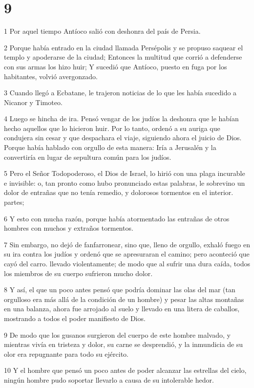 \chapter{9}

\par 1 Por aquel tiempo Antíoco salió con deshonra del país de Persia.
\par 2 Porque había entrado en la ciudad llamada Persépolis y se propuso saquear el templo y apoderarse de la ciudad; Entonces la multitud que corrió a defenderse con sus armas los hizo huir; Y sucedió que Antíoco, puesto en fuga por los habitantes, volvió avergonzado.
\par 3 Cuando llegó a Ecbatane, le trajeron noticias de lo que les había sucedido a Nicanor y Timoteo.
\par 4 Luego se hincha de ira. Pensó vengar de los judíos la deshonra que le habían hecho aquellos que lo hicieron huir. Por lo tanto, ordenó a su auriga que condujera sin cesar y que despachara el viaje, siguiendo ahora el juicio de Dios. Porque había hablado con orgullo de esta manera: Iría a Jerusalén y la convertiría en lugar de sepultura común para los judíos.
\par 5 Pero el Señor Todopoderoso, el Dios de Israel, lo hirió con una plaga incurable e invisible: o, tan pronto como hubo pronunciado estas palabras, le sobrevino un dolor de entrañas que no tenía remedio, y dolorosos tormentos en el interior. partes;
\par 6 Y esto con mucha razón, porque había atormentado las entrañas de otros hombres con muchos y extraños tormentos.
\par 7 Sin embargo, no dejó de fanfarronear, sino que, lleno de orgullo, exhaló fuego en su ira contra los judíos y ordenó que se apresuraran el camino; pero aconteció que cayó del carro. llevado violentamente; de modo que al sufrir una dura caída, todos los miembros de su cuerpo sufrieron mucho dolor.
\par 8 Y así, el que un poco antes pensó que podría dominar las olas del mar (tan orgulloso era más allá de la condición de un hombre) y pesar las altas montañas en una balanza, ahora fue arrojado al suelo y llevado en una litera de caballos, mostrando a todos el poder manifiesto de Dios.
\par 9 De modo que los gusanos surgieron del cuerpo de este hombre malvado, y mientras vivía en tristeza y dolor, su carne se desprendió, y la inmundicia de su olor era repugnante para todo su ejército.
\par 10 Y el hombre que pensó un poco antes de poder alcanzar las estrellas del cielo, ningún hombre pudo soportar llevarlo a causa de su intolerable hedor.
